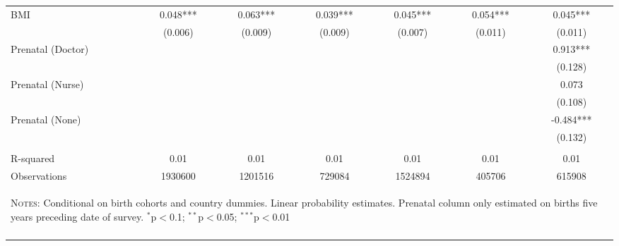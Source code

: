 \begin{table}[htpb!]
\begin{center}
{\begin{tabular}{lcccccc}
BMI&0.048***&0.063***&0.039***&0.045***&0.054***&0.045***\\
&(0.006)&(0.009)&(0.009)&(0.007)&(0.011)&(0.011)\\
Prenatal (Doctor)&&&&&&0.913***\\
&&&&&&(0.128)\\
Prenatal (Nurse)&&&&&&0.073\\
&&&&&&(0.108)\\
Prenatal (None)&&&&&&-0.484***\\
&&&&&&(0.132)\\
&&&&&&\\R-squared&0.01&0.01&0.01&0.01&0.01&0.01\\
Observations &1930600&1201516&729084&1524894&405706&615908\\
\hline\hline\multicolumn{7}{p{14.3cm}}{\begin{footnotesize}\textsc{Notes:} Conditional on birth cohorts and country dummies.  Linear probability estimates.  Prenatal column only estimated on births five years preceding date of survey.
$^{*}$p$<$0.1; $^{**}$p$<$0.05; $^{***}$p$<$0.01
 \end{footnotesize}}\\ \hline \normalsize \end{tabular}}\end{center}\end{table} 
